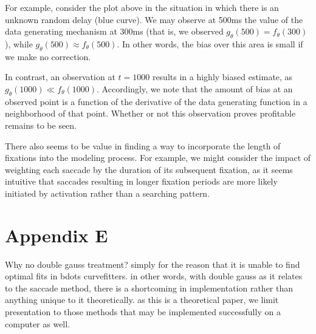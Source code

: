 \documentclass{article}
\begin{document}
For example, consider the plot above in the situation in which there is an unknown random delay (blue curve). We may observe at 500ms the value of the data generating mechanism at 300ms (that is, we observed $g_{\theta}(500) = f_{\theta}(300)$), while $g_{\theta}(500) \approx f_{\theta}(500)$. In other words, the bias over this area is small if we make no correction.

In contrast, an observation at $t = 1000$ results in a highly biased estimate, as $g_{\theta}(1000) \ll f_{\theta}(1000)$. Accordingly, we note that the amount of bias at an observed point is a function of the derivative of the data generating function in a neighborhood of that point. Whether or not this observation proves profitable remains to be seen.

There also seems to be value in finding a way to incorporate the length of fixations into the modeling process. For example, we might consider the impact of weighting each saccade by the duration of its subsequent fixation, as it seems intuitive that saccades resulting in longer fixation periods are more likely initiated by activation rather than a searching pattern.

\section*{Appendix E}

Why no double gauss treatment? simply for the reason that it is unable to find optimal fits in bdots curvefitters. in other words, with double gauss as it relates to the saccade method, there is a shortcoming in implementation rather than anything unique to it theoretically. as this is a theoretical paper, we limit presentation to those methods that may be implemented successfully on a computer as well.
\end{document}
